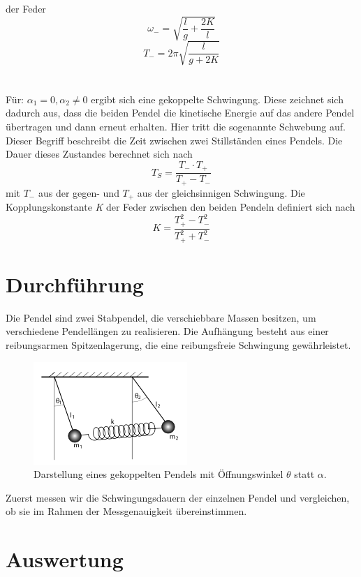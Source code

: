 der Feder
\begin{equation}
  \omega_{-} = \sqrt{\frac{l}{g} + \frac{2 \textit{K}}{l}}
  \label{e3}
\end{equation}
\begin{equation}
  \textit{T}_{-} = 2\pi  \sqrt{\frac{l}{g + 2 \textit{K}}}
  \label{e4}
\end{equation}
\\
\\
Für: $\alpha_{1} = 0, \alpha_{2} \neq 0$ ergibt sich eine gekoppelte Schwingung. Diese zeichnet sich dadurch aus, dass die beiden
Pendel die kinetische Energie auf das andere Pendel übertragen und dann erneut erhalten. Hier tritt die sogenannte Schwebung auf.
Dieser Begriff beschreibt die Zeit zwischen zwei Stillständen eines Pendels. Die Dauer dieses Zustandes berechnet sich nach
\begin{equation}
  \textit{T}_{S} = \frac{\textit{T}_{-} \cdot \textit{T}_{+}}{\textit{T}_{+} - \textit{T}_{-}}
  \label{e5}
\end{equation}
mit $\textit{T}_{-}$ aus der gegen- und $\textit{T}_{+}$ aus der gleichsinnigen Schwingung. Die Kopplungskonstante \textit{K}
der Feder zwischen den beiden Pendeln definiert sich nach
\begin{equation}
  \textit{K} = \frac{\textit{T}_{+}^{2} - \textit{T}_{-}^{2}}{\textit{T}_{+}^{2} + \textit{T}_{-}^{2}}
  \label{e6}
\end{equation}
\section{Durchführung}
Die Pendel sind zwei Stabpendel, die verschiebbare Massen besitzen, um verschiedene Pendellängen zu realisieren. Die
Aufhängung besteht aus einer reibungsarmen Spitzenlagerung, die eine reibungsfreie Schwingung gewährleistet.
\begin{figure}
  \centering
  \includegraphics{gekoppelte_pendel.png}
  \caption{Darstellung eines gekoppelten Pendels mit Öffnungswinkel $\theta$ statt $\alpha$.}
  \label{fig:skizze1}
\end{figure}
Zuerst messen wir die Schwingungsdauern der einzelnen Pendel und vergleichen, ob sie im Rahmen der Messgenauigkeit übereinstimmen.
\section{Auswertung}

\newpage
\nocite{*}
\printbibliography
